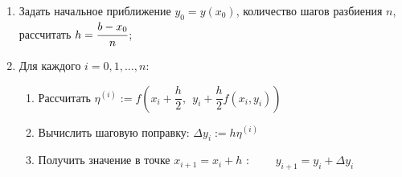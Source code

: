 \begin{enumerate}
    \item Задать начальное приближение $y_0=y(x_0)$, количество шагов разбиения $n$, рассчитать $h=\cfrac{b-x_0}{n}$;

    \item Для каждого $i=0,1,\ldots,n:$
    \begin{enumerate}
        \item Рассчитать $
        \eta^{(i)} := f\left(x_i+\dfrac{h}{2},~~ y_i+\dfrac{h}{2}f(x_i,y_i)\right)$

        \item Вычислить шаговую поправку: $\Delta y_i := h \eta^{(i)}$

        \item Получить значение в точке $x_{i+1} = x_i+h$ :~~~~ $y_{i+1} = y_i + \Delta y_i$
    \end{enumerate}
\end{enumerate}